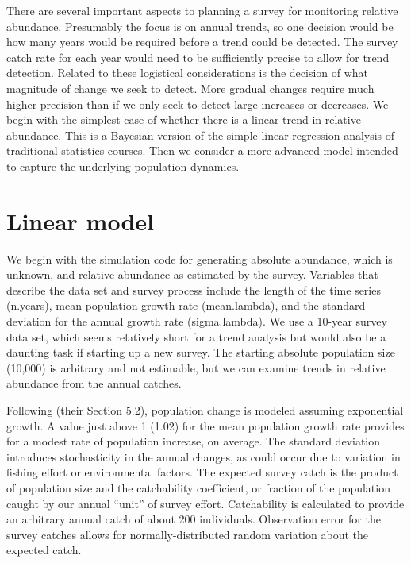 \documentclass[
]{krantz}
\begin{document}
There are several important aspects to planning a survey for monitoring relative abundance. Presumably the focus is on annual trends, so one decision would be how many years would be required before a trend could be detected. The survey catch rate for each year would need to be sufficiently precise to allow for trend detection. Related to these logistical considerations is the decision of what magnitude of change we seek to detect. More gradual changes require much higher precision than if we only seek to detect large increases or decreases. We begin with the simplest case of whether there is a linear trend in relative abundance. This is a Bayesian version of the simple linear regression analysis of traditional statistics courses. Then we consider a more advanced model intended to capture the underlying population dynamics.

\hypertarget{Linear}{%
\section{Linear model}\label{Linear}}

We begin with the simulation code for generating absolute abundance, which is unknown, and relative abundance as estimated by the survey. Variables that describe the data set and survey process include the length of the time series (n.years), mean population growth rate (mean.lambda), and the standard deviation for the annual growth rate (sigma.lambda). We use a 10-year survey data set, which seems relatively short for a trend analysis but would also be a daunting task if starting up a new survey. The starting absolute population size (10,000) is arbitrary and not estimable, but we can examine trends in relative abundance from the annual catches.

Following \citet{kéry.schaub_2011} (their Section 5.2), population change is modeled assuming exponential growth. A value just above 1 (1.02) for the mean population growth rate provides for a modest rate of population increase, on average. The standard deviation introduces stochasticity in the annual changes, as could occur due to variation in fishing effort or environmental factors. The expected survey catch is the product of population size and the catchability coefficient, or fraction of the population caught by our annual ``unit'' of survey effort. Catchability is calculated to provide an arbitrary annual catch of about 200 individuals. Observation error for the survey catches allows for normally-distributed random variation about the expected catch.
\end{document}
